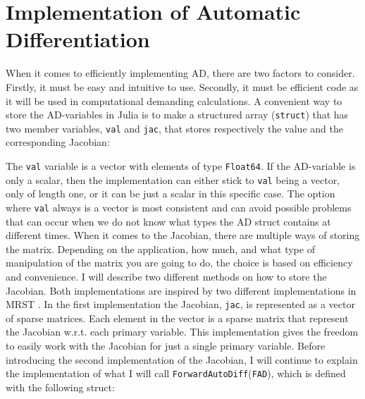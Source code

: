\section{Implementation of Automatic Differentiation}
\label{sec:ImplementationAD}
When it comes to efficiently implementing AD, there are two factors to consider. Firstly, it must be easy and intuitive to use. Secondly, it must be efficient code as it will be used in computational demanding calculations. A convenient way to store the AD-variables in Julia is to make a structured array (\texttt{struct}) that has two member variables, \texttt{val} and \texttt{jac}, that stores respectively the value and the corresponding Jacobian: 
 
The \texttt{val} variable is a vector with elements of type \texttt{Float64}. If the AD-variable is only a scalar, then the implementation can either stick to \texttt{val} being a vector, only of length one, or it can be just a scalar in this specific case. The option where \texttt{val} always is a vector is most consistent and can avoid possible problems that can occur when we do not know what types the AD struct contains at different times. When it comes to the Jacobian, there are multiple ways of storing the matrix. Depending on the application, how much, and what type of manipulation of the matrix you are going to do, the choice is based on efficiency and convenience. I will describe two different methods on how to store the Jacobian. Both implementations are inspired by two different implementations in MRST \emph{\citep{lieMrstUrl}}. In the first implementation the Jacobian, \texttt{jac}, is represented as a vector of sparse matrices. Each element in the vector is a sparse matrix that represent the Jacobian w.r.t. each primary variable. This implementation gives the freedom to easily work with the Jacobian for just a single primary variable. Before introducing the second implementation of the Jacobian, I will continue to explain the implementation of what I will call \texttt{ForwardAutoDiff}(\texttt{FAD}), which is defined with the following struct:



